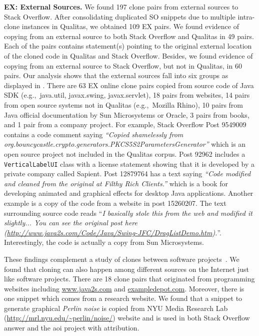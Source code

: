 \documentclass[10pt,journal,compsoc]{IEEEtran}
\begin{document}
\textbf{EX: External Sources.} We found 197 clone pairs from external sources to
Stack Overflow. After consolidating duplicated SO snippets due to multiple
intra-clone instances in Qualitas, we obtained 109 EX pairs. We found
evidence of copying from an external source to both Stack
Overflow and Qualitas in 49 pairs. Each of the pairs contains
statement(s) pointing to the original external location of the cloned
code in Qualitas and Stack Overflow. Besides, we found evidence
of copying from an external source to Stack Overflow, but not in
Qualitas, in 60 pairs. 
Our
analysis shows that the external sources fall into six groups as displayed in
. There are 63 EX online clone pairs copied
from source code of Java SDK (e.g.,\ \textsf{java.util}, \textsf{javax.swing}, \textsf{javax.servlet}), 
18 pairs from websites, 14 pairs from open
source systems not in Qualitas (e.g.,\ \textsf{Mozilla
	Rhino}), 10 pairs from Java official documentation by Sun
Microsystems or Oracle, 3 pairs from books, and 1 pair from a company
project. For example, Stack Overflow Post 9549009 contains a code comment saying
\textit{``Copied shamelessly from
	org.bouncycastle.crypto.generators.PKCS5S2ParametersGenerator''} which is an
open source project not included in the Qualitas corpus. Post 92962 includes a {\small\texttt{VerticalLabelUI}}
class with a license statement showing that it is developed by a private company
called \textsf{Sapient}. Post 12879764 has a text saying \textit{``Code modified
	and cleaned from the original at Filthy Rich Clients.''} which is a book for
developing animated and graphical effects for desktop Java applications. Another
example is a copy of the code from a website in post 15260207. The text surrounding
source code reads ``\textit{I basically stole this from the web and modified it
	slightly... You can see the original post here
	(\url{http://www.java2s.com/Code/Java/Swing-JFC/DragListDemo.htm}).}''.
Interestingly, the code is actually a copy from Sun Microsystems.

These findings complement a study of clones between software
projects~\cite{Svajlenko2014}. We found that cloning can also happen among
different sources on the Internet just like software projects. There are 18 clone
pairs that originated from programming websites including \url{www.java2s.com}
and \url{exampledepot.com}. Moreover, there is one snippet which comes from a
research website. We found that a snippet to generate graphical \textit{Perlin
	noise} is copied from NYU Media Research Lab
(\url{http://mrl.nyu.edu/~perlin/noise/}) website and is used in both Stack Overflow
answer and the \textsf{aoi} project with attribution. 
\end{document}

